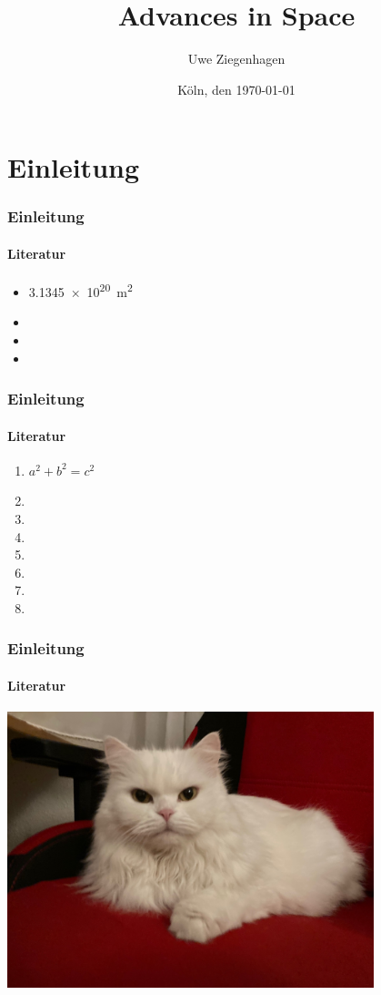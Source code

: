 \documentclass[14pt,ngerman]{beamer}
\author{Uwe Ziegenhagen}
\title{Advances in Space}
\institute{Dante e.V. Heidelberg}
\date{Köln, den \today}
\begin{document}
\begin{frame}
\maketitle

\end{frame}

\section{Einleitung}

\begin{frame}
\frametitle{Einleitung}
\framesubtitle{Literatur}

\begin{itemize}
	\item \SI{3.1345e20}{m^2}
	\item 
	\item 
	\item 
\end{itemize}

\end{frame}


\begin{frame}
\frametitle{Einleitung}
\framesubtitle{Literatur}

\begin{enumerate}
	\item \(a^2+b^2=c^2\)
	\item 
	\item 
	\item 
	\item 
	\item 
	\item 
	\item 
\end{enumerate}


\end{frame}

\begin{frame}
\frametitle{Einleitung}
\framesubtitle{Literatur}

\begin{center}
\includegraphics[width=0.8\textwidth]{Bilder/Katze}
\end{center}

\end{frame}
\end{document}
